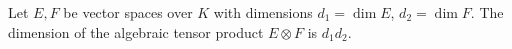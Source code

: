 Let $E, F$ be vector spaces over $K$ with dimensions $d_1 = \dim E$, $d_2 = \dim F$. The dimension of the algebraic tensor product $E \otimes F$ is $d_1 d_2$.
